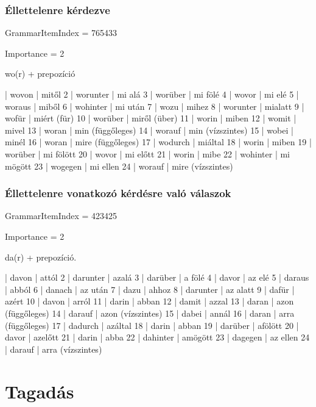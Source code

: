 \documentclass{article}
\newenvironment{desc}{\verbatim}{\endverbatim}
\newenvironment{exmp}{\verbatim}{\endverbatim}
\begin{document}
\subsubsection{Éllettelenre kérdezve}

GrammarItemIndex = 765433

Importance = 2

\begin{desc}
wo(r) + prepozíció
\end{desc}

\begin{exmp}
1 | wovon | mitől
2 | worunter | mi alá
3 | worüber | mi fölé
4 | wovor | mi elé
5 | woraus | miből
6 | wohinter | mi után
7 | wozu | mihez
8 | worunter | mialatt
9 | wofür | miért (für)
10 | worüber | miről (über)
11 | worin | miben
12 | womit | mivel
13 | woran | min (függőleges)
14 | worauf | min (vízszintes)
15 | wobei | minél
16 | woran | mire (függőleges)
17 | wodurch | miáltal
18 | worin | miben
19 | worüber | mi fölött
20 | wovor | mi előtt
21 | worin | mibe
22 | wohinter | mi mögött
23 | wogegen | mi ellen
24 | worauf | mire (vízszintes)
\end{exmp}

\subsubsection{Éllettelenre vonatkozó kérdésre való válaszok}

GrammarItemIndex = 423425

Importance = 2

\begin{desc}
da(r) + prepozíció.
\end{desc}

\begin{exmp}
1 | davon | attól
2 | darunter | azalá
3 | darüber | a fölé
4 | davor | az elé
5 | daraus | abból
6 | danach | az után
7 | dazu | ahhoz
8 | darunter | az alatt
9 | dafür | azért
10 | davon | arról
11 | darin | abban
12 | damit | azzal
13 | daran | azon (függőleges)
14 | darauf | azon (vízszintes)
15 | dabei | annál
16 | daran | arra (függőleges)
17 | dadurch | azáltal
18 | darin | abban
19 | darüber | afölött
20 | davor | azelőtt
21 | darin | abba
22 | dahinter | amögött
23 | dagegen | az ellen
24 | darauf | arra (vízszintes)
\end{exmp}

\section{Tagadás}
\end{document}
